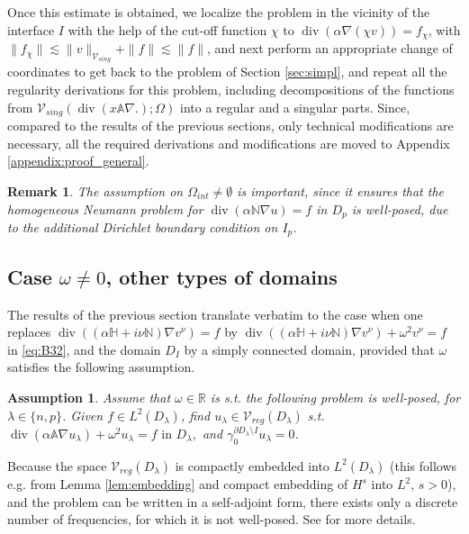 \documentclass[report]{elsarticle}
\newtheorem{assumption}[theorem]{Assumption}
\newtheorem{remark}[theorem]{Remark}
\numberwithin{theorem}{section}
\begin{document}
Once this estimate is obtained, we localize the problem in the vicinity of the interface $I$ with the help of the cut-off function $\chi$ to $\operatorname{div}(\alpha\nabla (\chi v))=f_{\chi}$, with $\|f_{\chi}\|\lesssim \|v\|_{\mathcal{V}_{sing}}+\|f\|\lesssim \|f\|$, and next perform an appropriate change of coordinates to get back to the problem of Section \ref{sec:simpl}, and repeat all the regularity derivations for this problem, including decompositions of the functions from $\mathcal{V}_{sing}(\operatorname{div}(x\mathbb{A}\nabla.); \Omega)$ into a regular and a singular parts.  Since, compared to the results of the previous sections, only technical modifications are necessary, all the required derivations and modifications are moved to Appendix \ref{appendix:proof_general}. 
\begin{remark}
	\label{rem:assumptionomegaint}
	The assumption on $\Omega_{int}\neq \emptyset$ is important, since it ensures that the homogeneous Neumann problem for $\operatorname{div}(\alpha\mathbb{N}\nabla u)=f$ in $D_p$ is well-posed, due to the additional Dirichlet boundary condition on $I_p$.
\end{remark}
\subsection{Case $\omega\neq 0$, other types of domains}
\label{sec:other}
The results of the previous section translate verbatim to the case when one replaces $\operatorname{div}((\alpha\mathbb{H}+i\nu \mathbb{N})\nabla v^{\nu})=f$ by   $\operatorname{div}((\alpha\mathbb{H}+i\nu \mathbb{N})\nabla v^{\nu})+\omega^2 v^{\nu}=f$ in \eqref{eq:B32}, and the domain $D_I$ by a simply connected domain, provided that $\omega$ satisfies the following assumption.
\begin{assumption}
	\label{remark:assumption}
	Assume that $\omega\in \mathbb{R}$ is s.t. the following problem is well-posed, for $\lambda\in \{n,p\}$. Given $f\in L^2(D_{\lambda})$, find $u_{\lambda}\in \mathcal{V}_{reg}(D_{\lambda})$ s.t. $\operatorname{div}(\alpha\mathbb{A}\nabla u_{\lambda})+\omega^2 u_{\lambda}=f \text{ in }D_{\lambda},$ and $\gamma_0^{\partial D_{\lambda}\setminus I}u_{\lambda}=0$. 
\end{assumption}
Because the space $\mathcal{V}_{reg}(D_{\lambda})$ is compactly embedded into $L^2(D_{\lambda})$ (this follows e.g. from Lemma \ref{lem:embedding} and compact embedding of $H^s$ into $L^2$, $s>0$), and the problem can be written in a self-adjoint form, there exists only a discrete number of frequencies, for which it is not well-posed. See \cite{baouendi_goulaouic} for more details.
\end{document}
